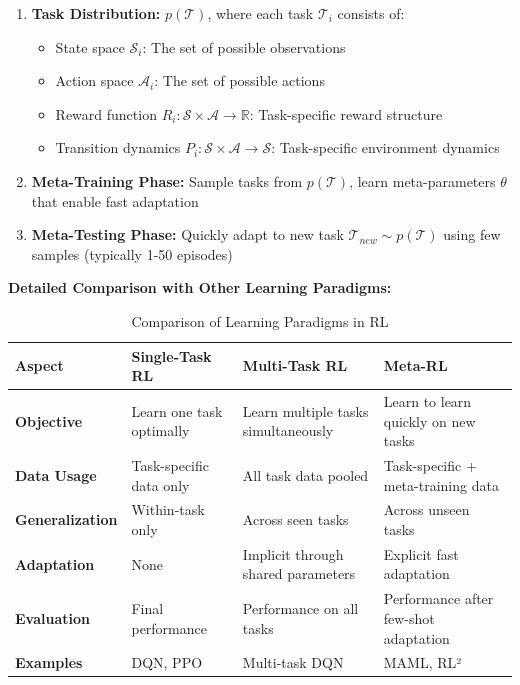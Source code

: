 \documentclass[12pt]{article}
\newcommand{\ieee}[1]{\textcolor{IEEEBlue}{\textbf{#1}}}
\begin{document}
{{			\begin{enumerate}
				\item \textbf{Task Distribution:} $p(\mathcal{T})$, where each task $\mathcal{T}_i$ consists of:
				\begin{itemize}
					\item State space $\mathcal{S}_i$: The set of possible observations
					\item Action space $\mathcal{A}_i$: The set of possible actions
					\item Reward function $R_i: \mathcal{S} \times \mathcal{A} \rightarrow \mathbb{R}$: Task-specific reward structure
					\item Transition dynamics $P_i: \mathcal{S} \times \mathcal{A} \rightarrow \mathcal{S}$: Task-specific environment dynamics
				\end{itemize}
				\item \textbf{Meta-Training Phase:} Sample tasks from $p(\mathcal{T})$, learn meta-parameters $\theta$ that enable fast adaptation
				\item \textbf{Meta-Testing Phase:} Quickly adapt to new task $\mathcal{T}_{new} \sim p(\mathcal{T})$ using few samples (typically 1-50 episodes)
			\end{enumerate}
			
			\ieee{Detailed Comparison with Other Learning Paradigms:}
			
			\begin{table}[H]
			\centering
			\caption{Comparison of Learning Paradigms in RL}
			\label{tab:learning_paradigms}
			\begin{tabular}{|l|p{3cm}|p{3cm}|p{3cm}|}
			\hline
			\textbf{Aspect} & \textbf{Single-Task RL} & \textbf{Multi-Task RL} & \textbf{Meta-RL} \\
			\hline
			\textbf{Objective} & Learn one task optimally & Learn multiple tasks simultaneously & Learn to learn quickly on new tasks \\
			\hline
			\textbf{Data Usage} & Task-specific data only & All task data pooled & Task-specific + meta-training data \\
			\hline
			\textbf{Generalization} & Within-task only & Across seen tasks & Across unseen tasks \\
			\hline
			\textbf{Adaptation} & None & Implicit through shared parameters & Explicit fast adaptation \\
			\hline
			\textbf{Evaluation} & Final performance & Performance on all tasks & Performance after few-shot adaptation \\
			\hline
			\textbf{Examples} & DQN, PPO & Multi-task DQN & MAML, RL² \\
			\hline
			\end{tabular}
			\end{table}
			
}}
\end{document}
